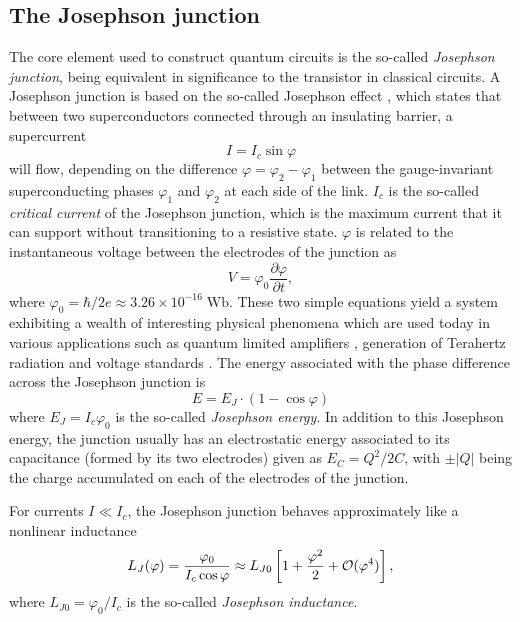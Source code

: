 \subsection{The Josephson junction}

The core element used to construct quantum circuits is the so-called {\it Josephson junction}, being equivalent in significance to the transistor in classical circuits. A Josephson junction is based on the so-called Josephson effect \citep{josephson_possible_1962}, which states that between two superconductors connected through an insulating barrier, a supercurrent
%
\begin{equation}
I = I_c\sin{\varphi}
\end{equation}
%
will flow, depending on the difference $\varphi = \varphi_2-\varphi_1$ between the gauge-invariant superconducting phases $\varphi_1$ and $\varphi_2$ at each side of the link. $I_c$ is the so-called {\it critical current} of the Josephson junction, which is the maximum current that it can support without transitioning to a resistive state. $\varphi$ is related to the instantaneous voltage between the electrodes of the junction as
%
\begin{equation}
V = \varphi_0\frac{\partial \varphi}{\partial t},
\end{equation}
%
where $\varphi_0 =\hbar/2e \approx 3.26\times 10^{-16}\;\mathrm{Wb}$. These two simple equations yield a system exhibiting a  wealth of interesting physical phenomena which are used today in various applications such as quantum limited amplifiers \citep{vijay_invited_2009}, generation of Terahertz radiation \citep{ozyuzer_emission_2007} and voltage standards \citep{levinsen_inverse_1977}. The energy associated with the phase difference across the Josephson junction is
%
\begin{equation}
E = E_J\cdot(1-\cos{\varphi})
\end{equation}
%
where $E_J = I_c\varphi_0$ is the so-called {\it Josephson energy}. In addition to this Josephson energy, the junction usually has an electrostatic energy associated to its capacitance (formed by its two electrodes) given as $E_C = Q^2/2C$, with $\pm|Q|$ being the charge accumulated on each of the electrodes of the junction.

\smallskip

For currents $I\ll I_c$, the Josephson junction behaves approximately like a nonlinear inductance
%
\begin{equation}
L_J(\varphi) = \frac{\varphi_0}{I_c \cos{\varphi}} \approx L_{J0}\left[1+\frac{\varphi^2}{2}+\begin{mathcal}O\end{mathcal}(\varphi^4)\right],\label{eq:josephson_inductance}
\end{equation}
%
where $L_{J0}=\varphi_0/ I_c$ is the so-called {\it Josephson inductance}. 

